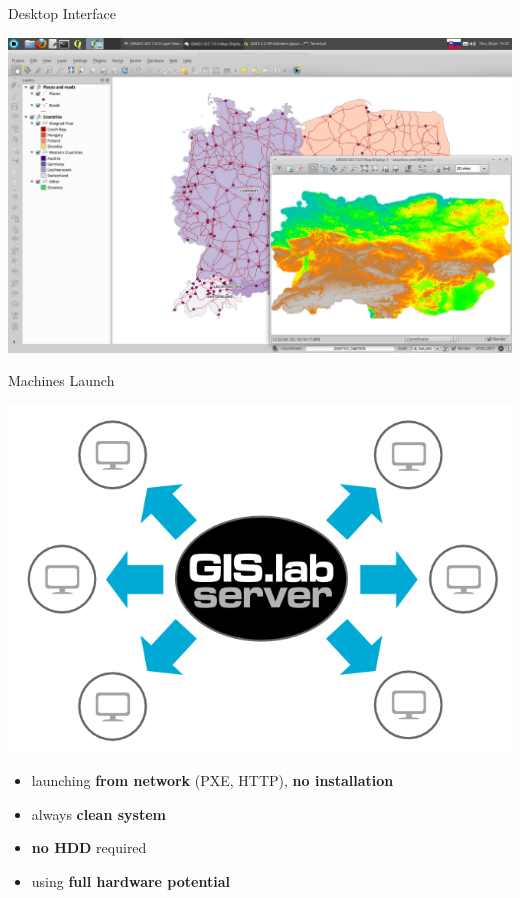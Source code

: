 \documentclass[12pt]{beamer}
\begin{document}
\begin{frame}[plain]{Desktop Interface}
	\begin{center}
		\includegraphics[keepaspectratio=true,width=\textwidth]{images/gislab-desktop-2.png}
	\end{center}
\end{frame}

\begin{frame}{Machines Launch}
	\begin{center}
		\includegraphics[keepaspectratio=true,height=0.4\textheight]{images/gislab-machines-launch.png}
	\end{center}
	\begin{itemize}
		\item launching \textbf{from network} (PXE, HTTP), \textbf{no installation}
		\item always \textbf{clean system}
		\item \textbf{no HDD} required
		\item using \textbf{full hardware potential}
	\end{itemize}
\end{frame}
\end{document}
